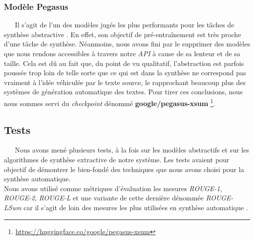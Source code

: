 \subsubsection{Modèle Pegasus}
$ _{} $ $ _{} $ $ _{} $ $ _{} $ $ _{} $Il s'agit de l'un des modèles jugés les plus performants pour les tâches de synthèse abstractive \cite{PEGASUSzhang2020pegasus}. En effet, son objectif de pré-entraînement est très proche d'une tâche de synthèse. Néanmoins, nous avons fini par le supprimer des modèles que nous rendons accessibles à travers notre \textit{API} à cause de sa lenteur et de sa taille. Cela est dû au fait que, du point de vu qualitatif, l'abstraction est parfois poussée trop loin de telle sorte que ce qui est dans la synthèse ne correspond pas vraiment à l'idée véhiculée par le texte source, le rapprochant beaucoup plus des systèmes de génération automatique des textes. Pour tirer ces conclusions, nous nous sommes servi du \textit{checkpoint} dénommé \textbf{google/pegasus-xsum} \footnote{\href{https://huggingface.co/google/pegasus-xsum}{https://huggingface.co/google/pegasus-xsum}}.
\subsection{Tests}
$ _{} $ $ _{} $ $ _{} $ $ _{} $ $ _{} $Nous avons mené plusieurs tests, à la fois sur les modèles abstractifs et sur les algorithmes de synthèse extractive de notre système. Les tests avaient pour objectif de démontrer le bien-fondé des techniques que nous avons choisi pour la synthèse automatique.\\
Nous avons utilisé comme métriques d'évaluation les mesures \textit{ROUGE-1}, \textit{ROUGE-2}, \textit{ROUGE-L} et une variante de cette dernière dénommée \textit{ROUGE-LSum} car il s'agit de loin des mesures les plus utilisées en synthèse automatique \cite{MaaliMnasri}.
